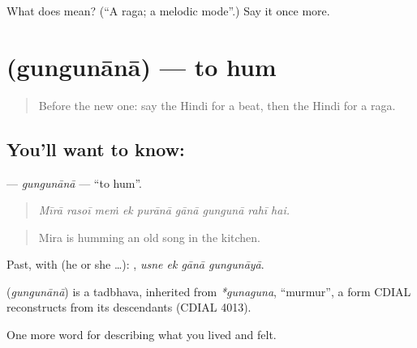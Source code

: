 \begin{tcolorbox}[breakable,colback=teal!4,colframe=teal!35!black,title={Before you move on}]
What does  mean? (\textquotedblleft{}A raga; a melodic mode\textquotedblright{}.) Say it once more.
\end{tcolorbox}
\section[\texorpdfstring{\hi{गुनगुनाना} (gungunānā)}{गुनगुनाना (gungunānā)}]{ (gungunānā) — to hum}

\label{lesson:HI-C530-gungunana}



\begin{quote}
Before the new one: say the Hindi for a beat, then the Hindi for a raga.
\end{quote}

\subsection*{You'll want to know: }
\textbf{} — \emph{gungunānā} — \textquotedblleft{}to hum\textquotedblright{}.

\begin{quote}
        
\end{quote}

\begin{quote}
\emph{Mīrā rasoī meṁ ek purānā gānā gungunā rahī hai.}
\end{quote}

\begin{quote}
Mira is humming an old song in the kitchen.
\end{quote}

Past, with  (he or she …):    , \emph{usne ek gānā gungunāyā}.

\begin{cousinweb}
\textbf{} (\emph{gungunānā}) is a tadbhava, inherited from \emph{*gunaguna}, \textquotedblleft{}murmur\textquotedblright{}, a form CDIAL reconstructs from its descendants (CDIAL 4013).
\end{cousinweb}

\begin{grammarlens}[title={What you've built}]
One more word for describing what you lived and felt.
\end{grammarlens}

